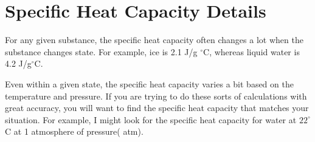 \section{Specific Heat Capacity Details}

For any given substance, the specific heat capacity often changes a
lot when the substance changes state. For example, ice is 2.1 J/g
$^\circ$C, whereas liquid water is 4.2 J/g$^\circ$C.

Even within a given state, the specific heat capacity varies a bit
based on the temperature and pressure. If you are trying to do these
sorts of calculations with great accuracy, you will want to find the
specific heat capacity that matches your situation. For example, I
might look for the specific heat capacity for water at $22^\circ$C at
1 atmosphere of pressure( atm).


